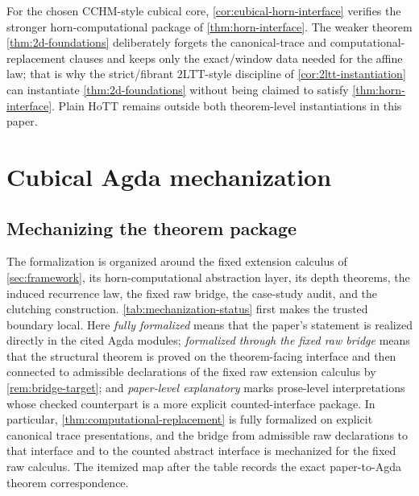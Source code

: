\documentclass{lmcs}
\begin{document}
For the chosen CCHM-style cubical core, \autoref{cor:cubical-horn-interface} verifies the stronger horn-computational package of \autoref{thm:horn-interface}. The weaker theorem \autoref{thm:2d-foundations} deliberately forgets the canonical-trace and computational-replacement clauses and keeps only the exact/window data needed for the affine law; that is why the strict/fibrant $2$LTT-style discipline of \autoref{cor:2ltt-instantiation} can instantiate \autoref{thm:2d-foundations} without being claimed to satisfy \autoref{thm:horn-interface}. Plain HoTT remains outside both theorem-level instantiations in this paper.

\section{Cubical Agda mechanization}
\label{sec:mechanization}

\subsection{Mechanizing the theorem package}

The formalization is organized around the fixed extension calculus of \autoref{sec:framework}, its horn-computational abstraction layer, its depth theorems, the induced recurrence law, the fixed raw bridge, the case-study audit, and the clutching construction. \autoref{tab:mechanization-status} first makes the trusted boundary local. Here \emph{fully formalized} means that the paper's statement is realized directly in the cited Agda modules; \emph{formalized through the fixed raw bridge} means that the structural theorem is proved on the theorem-facing interface and then connected to admissible declarations of the fixed raw extension calculus by \autoref{rem:bridge-target}; and \emph{paper-level explanatory} marks prose-level interpretations whose checked counterpart is a more explicit counted-interface package. In particular, \autoref{thm:computational-replacement} is fully formalized on explicit canonical trace presentations, and the bridge from admissible raw declarations to that interface and to the counted abstract interface is mechanized for the fixed raw calculus. The itemized map after the table records the exact paper-to-Agda theorem correspondence.
\end{document}
